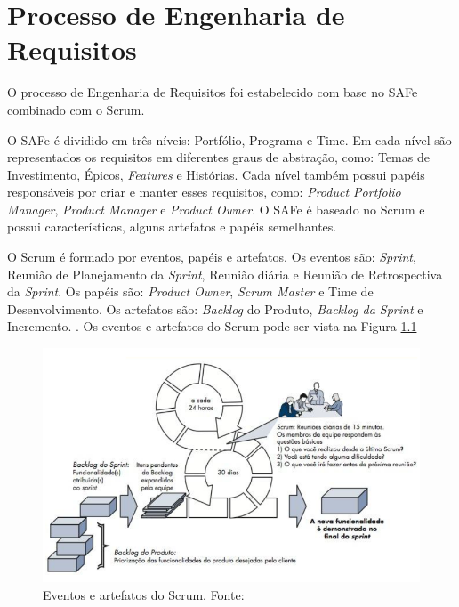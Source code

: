 \chapter[Processo de Engenharia de Requisitos]{Processo de Engenharia de Requisitos}

O processo de Engenharia de Requisitos foi estabelecido com base no SAFe combinado com o Scrum.

O SAFe é dividido em três níveis: Portfólio, Programa e Time. Em cada nível são representados os requisitos
em diferentes graus de abstração, como: Temas de Investimento, Épicos, \textit{Features} e Histórias.
Cada nível também possui papéis responsáveis por criar e manter esses requisitos, como: \textit{Product Portfolio Manager}, 
\textit{Product Manager} e \textit{Product Owner}. O SAFe é baseado no Scrum e
possui características, alguns artefatos e papéis semelhantes. \cite{safe}

% 

O Scrum é formado por eventos, papéis e artefatos. Os eventos são: \textit{Sprint}, Reunião de Planejamento
da \textit{Sprint}, Reunião diária e Reunião de Retrospectiva da \textit{Sprint}. Os papéis são: \textit{Product Owner},
\textit{Scrum Master} e Time de Desenvolvimento. Os artefatos são: \textit{Backlog} do Produto, \textit{Backlog da Sprint} e Incremento. \cite{scrum}.
Os eventos e artefatos do Scrum pode ser vista na Figura \ref{fig:scrum}

\begin{figure}[!htb]
\centering
\includegraphics[scale=0.7]{figuras/scrum.png}
\caption{Eventos e artefatos do Scrum. Fonte: \cite{pressman}}
\label{fig:scrum}
\end{figure}


